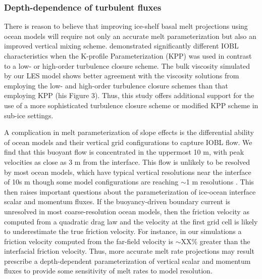 \documentclass[draft]{agujournal2019}
\begin{document}
\subsubsection{Depth-dependence of turbulent fluxes}

There is reason to believe that improving ice-shelf basal melt projections using ocean models will require not only an accurate melt parameterization but also an improved vertical mixing scheme.  demonstrated significantly different IOBL characteristics when the K-profile Parameterization (KPP) was used in contrast to a low- or high-order turbulence closure scheme. The bulk viscosity simulated by our LES model shows better agreement with the viscosity solutions from  employing the low- and high-order turbulence closure schemes than that employing KPP (his Figure 3). Thus, this study offers additional support for the use of a more sophisticated turbulence closure scheme or modified KPP scheme in sub-ice settings.

A complication in melt parameterization of slope effects is the differential ability of ocean models and their vertical grid configurations to capture IOBL flow. We find that this buoyant flow is concentrated in the uppermost 10 m, with peak velocities as close as 3 m from the interface. This flow is unlikely to be resolved by most ocean models, which have typical vertical resolutions near the interface of 10s m though some model configurations are reaching $\sim$1 m resolutions \cite{gwyther_cold_2020}. This then raises important questions about the parameterization of ice-ocean interface scalar and momentum fluxes. If the buoyancy-driven boundary current is unresolved in most coarse-resolution ocean models, then the friction velocity as computed from a quadratic drag law and the velocity at the first grid cell is likely to underestimate the true friction velocity. For instance, in our simulations a friction velocity computed from the far-field velocity is $\sim$XX\% greater than the interfacial friction velocity. Thus, more accurate melt rate projections may result prescribe a depth-dependent parameterization of vertical scalar and momentum fluxes to provide some sensitivity of melt rates to model resolution. 
\end{document}
